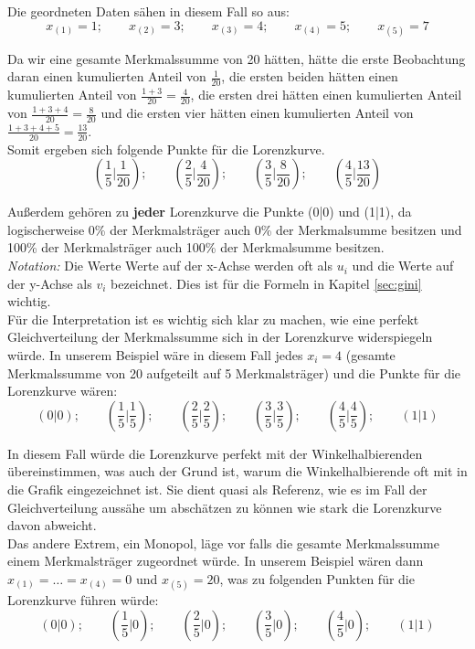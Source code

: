 \documentclass[a4paper]{article}
\newcommand\dangersign{%
 \makebox[1.8em][c]{%
 \makebox[0pt][c]{\raisebox{.15em}{\small!}}%
 \makebox[0pt][c]{\color{red}\Large$\triangle$}}}%
\begin{document}
\noindent Die geordneten Daten sähen in diesem Fall so aus:
$$x_{(1)} = 1;\qquad x_{(2)} = 3;\qquad x_{(3)} = 4;\qquad x_{(4)} = 5;\qquad x_{(5)} = 7$$

\noindent Da wir eine gesamte Merkmalssumme von 20 hätten, hätte die erste Beobachtung daran einen kumulierten Anteil von $\frac{1}{20}$, die ersten beiden hätten einen kumulierten Anteil von $\frac{1+3}{20} = \frac{4}{20}$, die ersten drei hätten einen kumulierten Anteil von $\frac{1+3+4}{20} = \frac{8}{20}$ und die ersten vier hätten einen kumulierten Anteil von $\frac{1+3+4+5}{20} = \frac{13}{20}$.\\
Somit ergeben sich folgende Punkte für die Lorenzkurve.
$$(\frac{1}{5}|\frac{1}{20});\qquad (\frac{2}{5}|\frac{4}{20});\qquad (\frac{3}{5}|\frac{8}{20});\qquad (\frac{4}{5}|\frac{13}{20})$$

\noindent Außerdem gehören zu \textbf{jeder} Lorenzkurve die Punkte (0|0) und (1|1), da logischerweise 0\% der Merkmalsträger auch 0\% der Merkmalsumme besitzen und 100\% der Merkmalsträger auch 100\% der Merkmalsumme besitzen.\\

\noindent \dangersign \textit{Notation:} Die Werte Werte auf der x-Achse werden oft als $u_i$ und die Werte auf der y-Achse als $v_i$ bezeichnet. Dies ist für die Formeln in Kapitel \ref{sec:gini} wichtig.\\

\noindent Für die Interpretation ist es wichtig sich klar zu machen, wie eine perfekt Gleichverteilung der Merkmalssumme sich in der Lorenzkurve widerspiegeln würde. In unserem Beispiel wäre in diesem Fall jedes $x_i = 4$ (gesamte Merkmalssumme von 20 aufgeteilt auf 5 Merkmalsträger) und die Punkte für die Lorenzkurve wären:
$$(0|0);\qquad(\frac{1}{5}|\frac{1}{5});\qquad (\frac{2}{5}|\frac{2}{5});\qquad (\frac{3}{5}|\frac{3}{5});\qquad (\frac{4}{5}|\frac{4}{5});\qquad (1|1)$$

\noindent In diesem Fall würde die Lorenzkurve perfekt mit der Winkelhalbierenden übereinstimmen, was auch der Grund ist, warum die Winkelhalbierende oft mit in die Grafik eingezeichnet ist. Sie dient quasi als Referenz, wie es im Fall der Gleichverteilung aussähe um abschätzen zu können wie stark die Lorenzkurve davon abweicht.\\
Das andere Extrem, ein Monopol, läge vor falls die gesamte Merkmalssumme einem Merkmalsträger zugeordnet würde. In unserem Beispiel wären dann $x_{(1)} = \hdots = x_{(4)} = 0$ und $x_{(5)} = 20$, was zu folgenden Punkten für die Lorenzkurve führen würde:
$$(0|0);\qquad(\frac{1}{5}|0);\qquad (\frac{2}{5}|0);\qquad (\frac{3}{5}|0);\qquad (\frac{4}{5}|0);\qquad (1|1)$$
\end{document}
